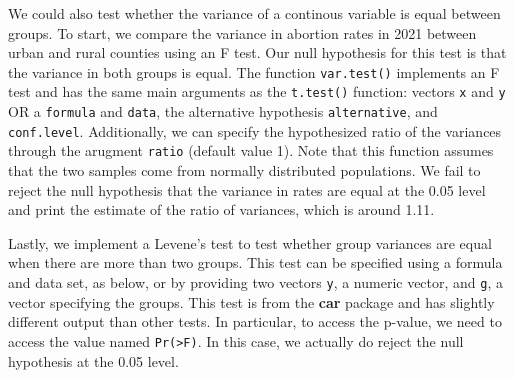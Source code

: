 \documentclass[
  letterpaper,
]{krantz}
\makeatletter
\newenvironment{Shaded}{\begin{snugshade}}{\end{snugshade}}
\newcommand{\CommentTok}[1]{\textcolor[rgb]{0.37,0.37,0.37}{#1}}
\newcommand{\FunctionTok}[1]{\textcolor[rgb]{0.28,0.35,0.67}{#1}}
\newcommand{\NormalTok}[1]{\textcolor[rgb]{0.00,0.23,0.31}{#1}}
\newcommand{\OtherTok}[1]{\textcolor[rgb]{0.00,0.23,0.31}{#1}}
\newcommand{\SpecialCharTok}[1]{\textcolor[rgb]{0.37,0.37,0.37}{#1}}
\newenvironment{kframe}{%
\medskip{}
\setlength{\fboxsep}{.8em}
 \def\at@end@of@kframe{}%
 \ifinner\ifhmode%
  \def\at@end@of@kframe{\end{minipage}}%
  \begin{minipage}{\columnwidth}%
 \fi\fi%
 \def\FrameCommand##1{\hskip\@totalleftmargin \hskip-\fboxsep
 \colorbox{shadecolor}{##1}\hskip-\fboxsep
     \hskip-\linewidth \hskip-\@totalleftmargin \hskip\columnwidth}%
 \MakeFramed {\advance\hsize-\width
   \@totalleftmargin\z@ \linewidth\hsize
   \@setminipage}}%
 {\par\unskip\endMakeFramed%
 \at@end@of@kframe}
\renewenvironment{Shaded}{\begin{kframe}}{\end{kframe}}
\makeatother
\begin{document}
We could also test whether the variance of a continous variable is equal
between groups. To start, we compare the variance in abortion rates in
2021 between urban and rural counties using an F test. Our null
hypothesis for this test is that the variance in both groups is equal.
The function \texttt{var.test()} implements an F test and has the same
main arguments as the \texttt{t.test()} function: vectors \texttt{x} and
\texttt{y} OR a \texttt{formula} and \texttt{data}, the alternative
hypothesis \texttt{alternative}, and \texttt{conf.level}. Additionally,
we can specify the hypothesized ratio of the variances through the
arugment \texttt{ratio} (default value 1). Note that this function
assumes that the two samples come from normally distributed populations.
We fail to reject the null hypothesis that the variance in rates are
equal at the 0.05 level and print the estimate of the ratio of
variances, which is around 1.11.

\begin{Shaded}
\end{Shaded}

Lastly, we implement a Levene's test to test whether group variances are
equal when there are more than two groups. This test can be specified
using a formula and data set, as below, or by providing two vectors
\texttt{y}, a numeric vector, and \texttt{g}, a vector specifying the
groups. This test is from the \textbf{car} package and has slightly
different output than other tests. In particular, to access the p-value,
we need to access the value named
\texttt{\textquotesingle{}Pr(\textgreater{}F)\textquotesingle{}}. In
this case, we actually do reject the null hypothesis at the 0.05 level.
\end{document}
